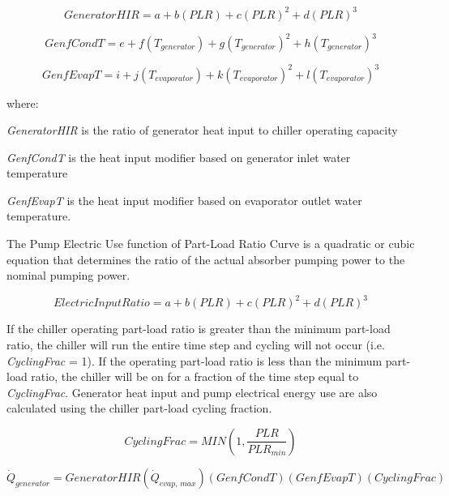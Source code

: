 \begin{equation}
GeneratorHIR = a + b\left( {PLR} \right) + c{\left( {PLR} \right)^2} + d{\left( {PLR} \right)^3}
\end{equation}

\begin{equation}
GenfCondT = e + f\left( {{T_{generator}}} \right) + g{\left( {{T_{generator}}} \right)^2} + h{\left( {{T_{generator}}} \right)^3}
\end{equation}

\begin{equation}
GenfEvapT = i + j\left( {{T_{evaporator}}} \right) + k{\left( {{T_{evaporator}}} \right)^2} + l{\left( {{T_{evaporator}}} \right)^3}
\end{equation}

where:

\emph{GeneratorHIR} is the ratio of generator heat input to chiller operating capacity

\emph{GenfCondT} is the heat input modifier based on generator inlet water temperature

\emph{GenfEvapT} is the heat input modifier based on evaporator outlet water temperature.

The Pump Electric Use function of Part-Load Ratio Curve is a quadratic or cubic equation that determines the ratio of the actual absorber pumping power to the nominal pumping power.

\begin{equation}
ElectricInputRatio = a + b\left( {PLR} \right) + c{\left( {PLR} \right)^2} + d{\left( {PLR} \right)^3}
\end{equation}

If the chiller operating part-load ratio is greater than the minimum part-load ratio, the chiller will run the entire time step and cycling will not occur (i.e. \emph{CyclingFrac} = 1). If the operating part-load ratio is less than the minimum part-load ratio, the chiller will be on for a fraction of the time step equal to \emph{CyclingFrac}. Generator heat input and pump electrical energy use are also calculated using the chiller part-load cycling fraction.

\begin{equation}
CyclingFrac = MIN\left( {1,\frac{{PLR}}{{PL{R_{min}}}}} \right)
\end{equation}

\begin{equation}
{\dot Q_{generator}} = GeneratorHIR\left( {{{\dot Q}_{evap,\,max}}} \right)\left( {GenfCondT} \right)\left( {GenfEvapT} \right)\left( {CyclingFrac} \right)
\end{equation}

